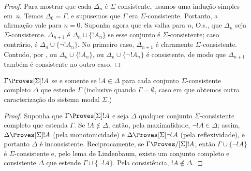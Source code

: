 \documentclass[../../../include/open-logic-section]{subfiles}
\begin{document}
\begin{proof}
Para mostrar que cada $\Delta_n$ é $\Sigma$-consistente, usamos uma
indução simples em~$n$. Temos $\Delta_0 = \Gamma$, e supusemos que
$\Gamma$ era $\Sigma$-consistente. Portanto, a afirmação vale para
$n = 0$. Suponha agora que ela valha para $n$, O.s.\@, que $\Delta_n$
seja $\Sigma$-consistente. $\Delta_{n+1}$ é
$\Delta_n \cup \{!A_n\}$ se esse conjunto é $\Sigma$-consistente; caso
contrário, é $\Delta_n \cup \{\lnot!A_n\}$. No primeiro caso,
$\Delta_{n+1}$ é claramente $\Sigma$-consistente. Contudo, por
,
ou $\Delta_n \cup \{!A_n\}$, ou $\Delta_n \cup \{\lnot!A_n\}$ é
consistente, de modo que $\Delta_{n+1}$ também é consistente no outro caso.
\end{proof}

\begin{cor}
  $\Gamma \Proves[\Sigma] !A$ se e somente se $!A \in \Delta$ para
  cada conjunto $\Sigma$-consistente completo $\Delta$ que estende
  $\Gamma$ (inclusive quando $\Gamma = \emptyset$, caso em que obtemos
  outra caracterização do sistema modal $\Sigma$.)
\end{cor}

\begin{proof}
  Suponha que $\Gamma \Proves[\Sigma] !A$ e seja $\Delta$ qualquer
  conjunto $\Sigma$-consistente completo que estenda $\Gamma$. Se
  $!A \notin \Delta$, então, pela maximalidade, $\lnot!A \in \Delta$;
  assim, $\Delta \Proves[\Sigma] !A$ (pela monotonicidade) e $\Delta
  \Proves[\Sigma] \lnot!A$ (pela reflexividade), e portanto $\Delta$ é
  inconsistente. Reciprocamente, se $\Gamma \Proves/[\Sigma] !A$,
  então $\Gamma \cup \{ \lnot!A\}$ é $\Sigma$-consistente e, pelo
  lema de Lindenbaum, existe um conjunto completo e consistente
  $\Delta$ que estende $\Gamma \cup \{ \lnot!A \}$. Pela consistência,
  $!A \notin \Delta$.
\end{proof}
\end{document}
